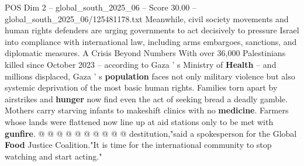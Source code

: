 \begin{textsample}{POS Dim 2 – global\_south\_2025\_06 – Score 30.00 – global\_south\_2025\_06/125481178.txt}
Meanwhile, civil society movements and human rights defenders are urging governments to act decisively to pressure Israel into compliance with international law, including arms embargoes, sanctions, and diplomatic measures.
A Crisis Beyond Numbers With over 36,000 Palestinians killed since October 2023 -- according to Gaza ' s Ministry of \textbf{Health} -- and millions displaced, Gaza ' s \textbf{population} faces not only military violence but also systemic deprivation of the most basic human rights.
Families torn apart by airstrikes and \textbf{hunger} now find even the act of seeking bread a deadly gamble.
Mothers carry starving infants to makeshift clinics with no \textbf{medicine}.
Farmers whose lands were flattened now line up at aid stations only to be met with \textbf{gunfire}. @ @ @ @ @ @ @ @ @ @ destitution,"said a spokesperson for the Global \textbf{Food} Justice Coalition."It is time for the international community to stop watching and start acting."

\end{textsample}
